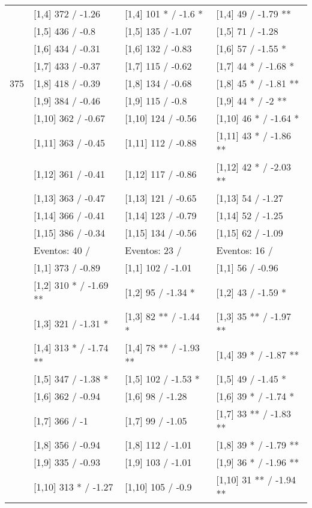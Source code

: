\begin{table}
\begin{tabular}[t]{llll}
\addlinespace
 & {}[1,4] 372  / -1.26 & {}[1,4] 101 * / -1.6 * & {}[1,4] 49  / -1.79 **\\
 & {}[1,5] 436  / -0.8 & {}[1,5] 135  / -1.07 & {}[1,5] 71  / -1.28\\
 & {}[1,6] 434  / -0.31 & {}[1,6] 132  / -0.83 & {}[1,6] 57  / -1.55 *\\
 & {}[1,7] 433  / -0.37 & {}[1,7] 115  / -0.62 & {}[1,7] 44 * / -1.68 *\\
375 & {}[1,8] 418  / -0.39 & {}[1,8] 134  / -0.68 & {}[1,8] 45 * / -1.81 **\\
\addlinespace
 & {}[1,9] 384  / -0.46 & {}[1,9] 115  / -0.8 & {}[1,9] 44 * / -2 **\\
 & {}[1,10] 362  / -0.67 & {}[1,10] 124  / -0.56 & {}[1,10] 46 * / -1.64 *\\
 & {}[1,11] 363  / -0.45 & {}[1,11] 112  / -0.88 & {}[1,11] 43 * / -1.86 **\\
 & {}[1,12] 361  / -0.41 & {}[1,12] 117  / -0.86 & {}[1,12] 42 * / -2.03 **\\
 & {}[1,13] 363  / -0.47 & {}[1,13] 121  / -0.65 & {}[1,13] 54  / -1.27\\
\addlinespace
 & {}[1,14] 366  / -0.41 & {}[1,14] 123  / -0.79 & {}[1,14] 52  / -1.25\\
 & {}[1,15] 386  / -0.34 & {}[1,15] 134  / -0.56 & {}[1,15] 62  / -1.09\\
 & Eventos:  40 / & Eventos:  23 / & Eventos:  16 /\\
 & {}[1,1] 373  / -0.89 & {}[1,1] 102  / -1.01 & {}[1,1] 56  / -0.96\\
 & {}[1,2] 310 * / -1.69 ** & {}[1,2] 95  / -1.34 * & {}[1,2] 43  / -1.59 *\\
\addlinespace
 & {}[1,3] 321  / -1.31 * & {}[1,3] 82 ** / -1.44 * & {}[1,3] 35 ** / -1.97 **\\
 & {}[1,4] 313 * / -1.74 ** & {}[1,4] 78 ** / -1.93 ** & {}[1,4] 39 * / -1.87 **\\
 & {}[1,5] 347  / -1.38 * & {}[1,5] 102  / -1.53 * & {}[1,5] 49  / -1.45 *\\
 & {}[1,6] 362  / -0.94 & {}[1,6] 98  / -1.28 & {}[1,6] 39 * / -1.74 *\\
 & {}[1,7] 366  / -1 & {}[1,7] 99  / -1.05 & {}[1,7] 33 ** / -1.83 **\\
\addlinespace
500 & {}[1,8] 356  / -0.94 & {}[1,8] 112  / -1.01 & {}[1,8] 39 * / -1.79 **\\
 & {}[1,9] 335  / -0.93 & {}[1,9] 103  / -1.01 & {}[1,9] 36 * / -1.96 **\\
 & {}[1,10] 313 * / -1.27 & {}[1,10] 105  / -0.9 & {}[1,10] 31 ** / -1.94 **\\

\end{tabular}
\end{table}
